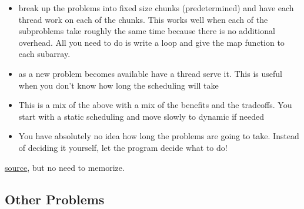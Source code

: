 \begin{itemize}
\item {} break up the problems into fixed size chunks (predetermined) and have each thread work on each of the chunks. This works well when each of the subproblems take roughly the same time because there is no additional overhead. All you need to do is write a loop and give the map function to each subarray. 
\item {} as a new problem becomes available have a thread serve it. This is useful when you don't know how long the scheduling will take 
\item {} This is a mix of the above with a mix of the benefits and the tradeoffs. You start with a static scheduling and move slowly to dynamic if needed 
\item {} You have absolutely no idea how long the problems are going to take. Instead of deciding it yourself, let the program decide what to do!
\end{itemize}

\href{https://software.intel.com/en-us/articles/openmp-loop-scheduling}{source}, but no need to memorize.


\subsection{Other Problems}\label{other-problems}

